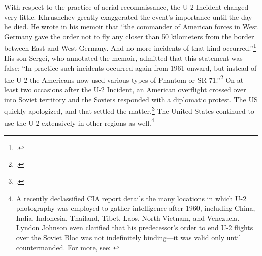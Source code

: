 \documentclass[14pt]{extarticle}
\begin{document}
With respect to the practice of aerial reconnaissance, the U-2 Incident changed very little. Khrushchev greatly exaggerated the event's importance until the day he died. He wrote in his memoir that \enquote{the commander of American forces in West Germany gave the order not to fly any closer than 50 kilometers from the border between East and West Germany. And no more incidents of that kind occurred.}\footcite[p.~256]{khrushchev_memoirs_2007} His son Sergei, who annotated the memoir, admitted that this statement was false: \enquote{In practice such incidents occurred again from 1961 onward, but instead of the U-2 the Americans now used various types of Phantom or SR-71.}\footcite[p.~258]{khrushchev_memoirs_2007} On at least two occasions after the U-2 Incident, an American overflight crossed over into Soviet territory and the Soviets responded with a diplomatic protest. The US quickly apologized, and that settled the matter.\footcite{orlov_u-2_2007} The United States continued to use the U-2 extensively in other regions as well.\footnote{A recently declassified CIA report details the many locations in which U-2 photography was employed to gather intelligence after 1960, including China, India, Indonesia, Thailand, Tibet, Laos, North Vietnam, and Venezuela. Lyndon Johnson even clarified that his predecessor's order to end U-2 flights over the Soviet Bloc was not indefinitely binding---it was valid only until countermanded. For more, see: \cite[p.~195]{pedlow_central_1992}}



\end{document}
